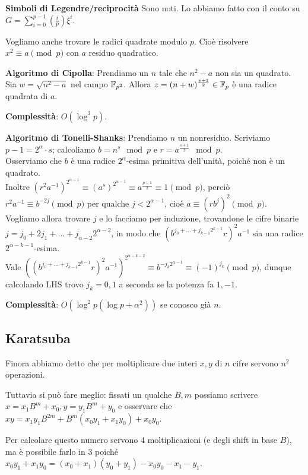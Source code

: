 \documentclass[a4paper]{book}
\begin{document}
    \textbf{Simboli di Legendre/reciprocità} Sono noti. Lo abbiamo fatto con il conto su $G=\sum_{i=0}^{p-1}\left( \frac{i}{p} \right)\xi^i$.

    \bigskip
    Vogliamo anche trovare le radici quadrate modulo $p$. Cioè risolvere $x^2\equiv a\pmod p$ con $a$ residuo quadratico.

    \bigskip
    \textbf{Algoritmo di Cipolla}: Prendiamo un $n$ tale che $n^2-a$ non sia un quadrato.\\
    Sia $w=\sqrt{n^2-a}$ nel campo $\mathbb{F}_{p^2}$. Allora $z=(n+w)^{\frac{p+1}{2}}\in\mathbb{F}_p$ è una radice quadrata di $a$.

    \textbf{Complessità}: $O(\log^3p)$.


    \bigskip
    \textbf{Algoritmo di Tonelli-Shanks}: Prendiamo $n$ un nonresiduo. Scriviamo $p-1=2^\alpha\cdot s$; calcoliamo $b=n^s\mod p$ e $r=a^{\frac{s+1}{2}} \mod p$.\\
    Osserviamo che $b$ è una radice $2^\alpha$-esima primitiva dell'unità, poiché non è un quadrato.\\
    Inoltre $(r^2a^{-1})^{2^{\alpha-1}}\equiv (a^s)^{2^{\alpha-1}}\equiv a^{\frac{p-1}{2}}\equiv1\pmod p$, perciò $r^2a^{-1}\equiv b^{-2j}\pmod p$ per qualche $j<2^{\alpha-1}$, cioè $a\equiv(rb^j)^2\pmod p$.\\
    Vogliamo allora trovare $j$ e lo facciamo per induzione, trovandone le cifre binarie $j=j_0+2j_1+\dots+j_{\alpha-2}2^{\alpha-2}$, in modo che $(b^{j_0+\dots+j_{k-1}2^{k-1}}r)^2a^{-1}$ sia una radice $2^{\alpha-k-1}$-esima.\\
    Vale $\left(  (b^{j_0+\dots+j_{k-1}2^{k-1}}r)^2a^{-1} \right)^{2^{\alpha-k-2}}\equiv b^{-j_k2^{\alpha-1}}\equiv(-1)^{j_k}\pmod p$, dunque calcolando LHS trovo $j_k=0,1$ a seconda se la potenza fa $1,-1$.

    \textbf{Complessità}: $O(\log^2 p(\log p+\alpha^2))$ se conosco già $n$.

    \subsection{Karatsuba}
    Finora abbiamo detto che per moltiplicare due interi $x,y$ di $n$ cifre servono $n^2$ operazioni.

    Tuttavia si può fare meglio: fissati un qualche $B,m$ possiamo scrivere $x=x_1B^m+x_0,y=y_1B^m+y_0$ e osservare che $xy=x_1y_1B^{2m}+B^m(x_0y_1+x_1y_0)+x_0y_0$.

    Per calcolare questo numero servono $4$ moltiplicazioni (e degli shift in base $B$), ma è possibile farlo in 3 poiché $x_0y_1+x_1y_0=(x_0+x_1)(y_0+y_1)-x_0y_0-x_1-y_1$.
\end{document}
